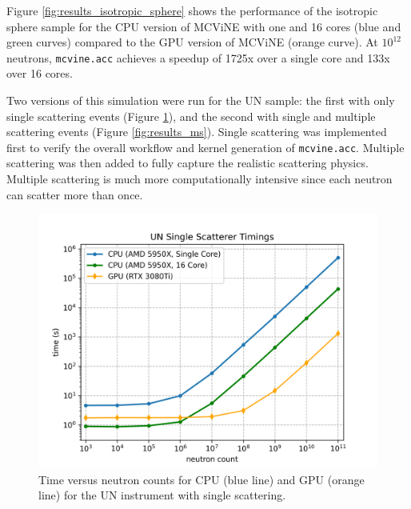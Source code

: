 Figure \ref{fig:results_isotropic_sphere} shows the performance of the isotropic sphere sample for the CPU version of MCViNE with one and 16 cores (blue and green curves) compared to the GPU version of MCViNE (orange curve). At $10^{12}$ neutrons, \texttt{mcvine.acc} achieves a speedup of 1725x over a single core and 133x over 16 cores.


Two versions of this simulation were run for the UN sample: the first with only single scattering events (Figure \ref{fig:results_ss}), and the second with single and multiple scattering events (Figure \ref{fig:results_ms}).
Single scattering was implemented first to verify the overall workflow and kernel generation of \texttt{mcvine.acc}. Multiple scattering was then added to fully capture the realistic scattering physics.
Multiple scattering is much more computationally intensive since each neutron can scatter more than once.

\begin{figure}[h]
    \centering
    \includegraphics[width=\columnwidth]{figures/mcvine_un_ss_timings.png}
    \caption{Time versus neutron counts for CPU (blue line) and GPU (orange line) for the UN instrument with single scattering.}
    \label{fig:results_ss}
\end{figure}

